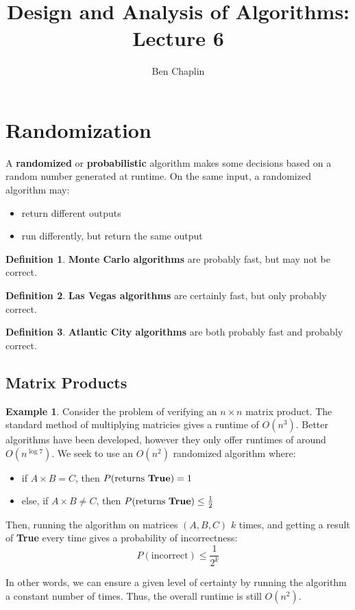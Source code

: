 \documentclass[11pt]{article}
\title{Design and Analysis of Algorithms: Lecture 6}
\author{Ben Chaplin}
\date{}
\theoremstyle{plain}
\theoremstyle{definition}
\newtheorem*{defn}{Definition}
\newtheorem*{ex}{Example}
\begin{document}
\maketitle
\tableofcontents

\section{Randomization}

A \textbf{randomized} or \textbf{probabilistic} algorithm makes some decisions based on a random 
number generated at runtime. On the same input, a randomized algorithm may:
\begin{itemize}
    \item return different outputs
    \item run differently, but return the same output
\end{itemize}

\begin{defn}
    \textbf{Monte Carlo algorithms} are probably fast, but may not be correct.
\end{defn}

\begin{defn}
    \textbf{Las Vegas algorithms} are certainly fast, but only probably correct.
\end{defn}

\begin{defn}
    \textbf{Atlantic City algorithms} are both probably fast and probably correct.
\end{defn}

\subsection{Matrix Products}

\begin{ex}
    Consider the problem of verifying an $n \times n$ matrix product.
    The standard method of multiplying matricies gives a runtime of $O(n^3)$. Better algorithms 
    have been developed, however they only offer runtimes of around $O(n^{\log 7})$. We seek to 
    use an $O(n^2)$ randomized algorithm where:
    \begin{itemize}
        \item if $A \times B = C$, then $P(\text{returns \textbf{True}}) = 1$
        \item else, if $A \times B \neq C$, then $P(\text{returns \textbf{True}}) \leq \frac{1}{2}$
    \end{itemize}

    Then, running the algorithm on matrices $(A, B, C)$ $k$ times, and getting a result of \textbf{True}
    every time gives a probability of incorrectness:
    $$P(\text{incorrect}) \leq \frac{1}{2^k}$$

    In other words, we can ensure a given level of certainty by running the algorithm a constant number 
    of times. Thus, the overall runtime is still $O(n^2)$. 
\end{ex}
\end{document}
